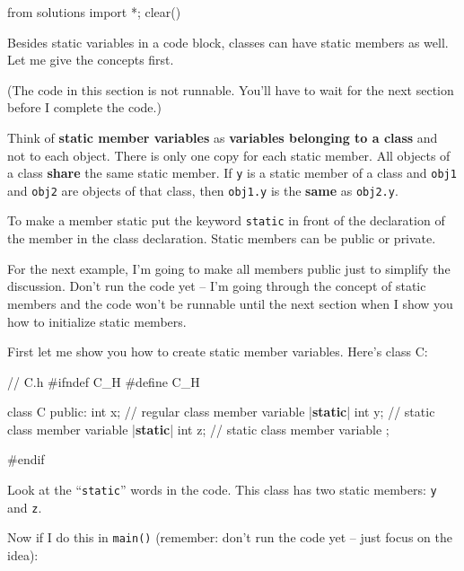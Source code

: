 \begin{python0}
from solutions import *; clear()
\end{python0}

Besides static variables in a code block, classes can have static
members as well. Let me give the concepts first.

(The code in this section is not runnable. You'll have
to wait for the next section before I complete the code.)

Think of \textbf{static member variables} as \textbf{variables belonging
to a class} and not to each object. There is only one copy for each
static member. All objects of a class \textbf{share} the same static
member. If \texttt{y} is a static member of a class and \texttt{obj1} and
\texttt{obj2} are objects of that class, then \texttt{obj1.y} is the
\textbf{same} as \texttt{obj2.y}.

To make a member static put the keyword \texttt{static} in front of the
declaration of the member in the class declaration. Static members can
be public or private.

For the next example, I'm going to make all members
public just to simplify the discussion. Don't run the
code yet -- I'm going through the concept of static
members and the code won't be runnable until the next
section when I show you how to initialize static members.

First let me show you how to create static member variables.
Here's class C:

\begin{consolethree}[escapeinside=||]
// C.h
#ifndef C_H
#define C_H

class C
{
public:
    int x;               // regular class member variable
    |{\bf static}| int y;       // static class member variable
    |{\bf static}| int z;       // static class member variable
};

#endif
\end{consolethree}

Look at the ``\texttt{static}'' words in the code. This class has two
static members: \texttt{y} and \texttt{z}.

Now if I do this in \texttt{main()} (remember: don't run
the code yet -- just focus on the idea):

\begin{consolethree}[escapeinside=||]
#include <iostream>
#include "C.h"

int main()
{
    C c, d, e; // 3 objects from class C
    ...
\end{consolethree}

